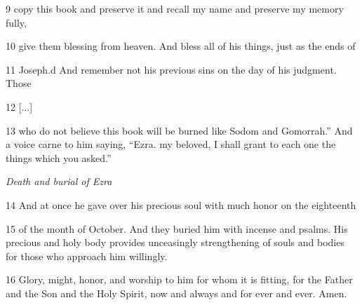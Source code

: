 \par 9 copy this book and preserve it and recall my name and preserve my memory fully,

\par 10 give them blessing from heaven. And bless all of his things, just as the ends of

\par 11 Joseph.d And remember not his previous sins on the day of his judgment. Those

\par 12 [...]

\par 13 who do not believe this book will be burned like Sodom and Gomorrah.” And a voice carne to him saying, “Ezra. my beloved, I shall grant to each one the things which you asked.”

\par \textit{Death and burial of Ezra}

\par 14 And at once he gave over his precious soul with much honor on the eighteenth

\par 15 of the month of October. And they buried him with incense and psalms. His precious and holy body provides unceasingly strengthening of souls and bodies for those who approach him willingly.

\par 16 Glory, might, honor, and worship to him for whom it is fitting, for the Father and the Son and the Holy Spirit, now and always and for ever and ever. Amen.


